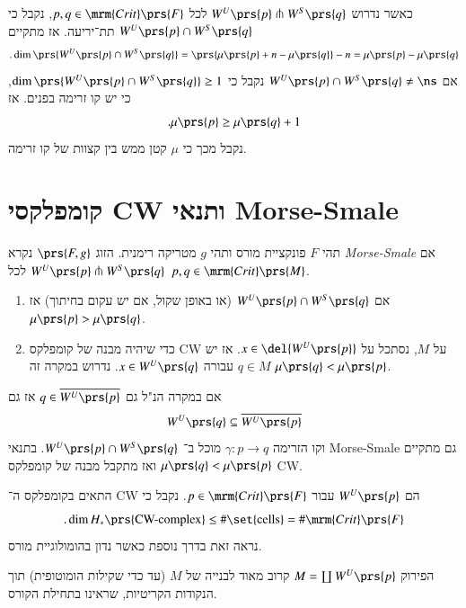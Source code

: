 \documentclass[a4paper,10pt,twoside,openany]{book}
\begin{document}
כאשר נדרוש
$W^U\prs{p} \pitchfork W^S\prs{q}$
לכל
$p,q \in \mrm{Crit}\prs{F}$,
נקבל כי
$W^U\prs{p} \cap W^S\prs{q}$
תת־יריעה. אז מתקיים
\[\text{.} \dim\prs{W^U\prs{p} \cap W^S\prs{q}} = \prs{\mu\prs{p} + n - \mu\prs{q}} - n = \mu\prs{p} - \mu\prs{q}\]
אם
$W^U\prs{p} \cap W^S\prs{q} \neq \ns$
נקבל כי
$\dim \prs{W^U\prs{p} \cap W^S\prs{q}} \geq 1$,
כי יש קו זרימה בפנים. אז
\[\text{.} \mu\prs{p} \geq \mu\prs{q}+1\]
נקבל מכך כי
$\mu$
קטן ממש בין קצוות של קו זרימה.

\section{קומפלקסי \textenglish{CW} ותנאי \textenglish{Morse-Smale}}

\begin{definition}
תהי
$F$
פונקציית מורס ותהי
$g$
מטריקה רימנית.
הזוג
$\prs{F,g}$
נקרא
\emph{\textenglish{Morse-Smale}}
אם
$W^U\prs{p} \pitchfork W^S\prs{q}$
לכל
$p,q \in \mrm{Crit}\prs{M}$.
\end{definition}

\begin{corollary}
\begin{enumerate}
\item אם
$W^U\prs{p} \cap W^S\prs{q}$
(או באופן שקול, אם יש עקום בחיתוך)
אז
$\mu\prs{p} > \mu\prs{q}$.
\item כדי שיהיה מבנה של קומפלקס
\textenglish{CW}
על
$M$,
נסתכל על
$x \in \del{W^U\prs{p}}$.
אז יש
$q \in M$
עבורה
$x \in W^U\prs{q}$.
נדרוש במקרה זה
$\mu\prs{q} < \mu\prs{p}$.
\end{enumerate}
\end{corollary}

\begin{proposition}\label{proposition:CW-structure}
אם במקרה הנ"ל גם
$q \in \overline{W^U\prs{p}}$
אז גם
\[W^U\prs{q} \subseteq \overline{W^U\prs{p}}\]
וקו הזרימה
$\gamma \colon p \to q$
מוכל ב־%
$W^U\prs{p} \cap W^S\prs{q}$.
בתנאי
\textenglish{Morse-Smale}
גם מתקיים
$\mu\prs{q} < \mu\prs{p}$
ואז מתקבל מבנה של קומפלקס
\textenglish{CW}.
\end{proposition}

\begin{remark}
התאים בקומפלקס ה־%
\textenglish{CW}
הם
$W^U\prs{p}$
עבור
$p \in \mrm{Crit}\prs{F}$.
נקבל כי
\[\text{.} \dim H_*\prs{\text{CW-complex}} \leq \# \set{\text{cells}} = \# \mrm{Crit}\prs{F}\]
נראה זאת בדרך נוספת כאשר נדון בהומולוגיית מורס.
\end{remark}

\begin{remark}
הפירוק
$M = \coprod W^U\prs{p}$
קרוב מאוד לבנייה של
$M$
(עד כדי שקילות הומוטופית) תוך הנקודות הקריטיות, שראינו בתחילת הקורס.
\end{remark}
\end{document}
